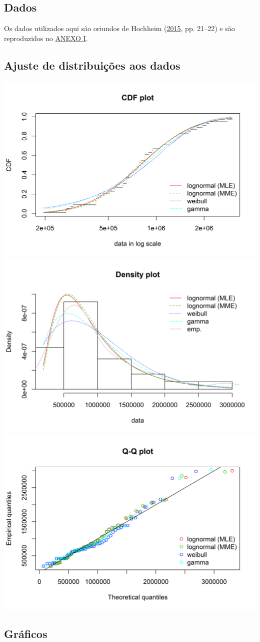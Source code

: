\documentclass[a4paper]{article}
\begin{document}
\subsection{Dados}\label{dados}

Os dados utilizados aqui são oriundos de Hochheim
(\protect\hyperlink{ref-hochheim}{2015}, pp. 21--22) e são reproduzidos
no \protect\hyperlink{anexo-i}{ANEXO I}.

\subsection{Ajuste de distribuições aos
dados}\label{ajuste-de-distribuicoes-aos-dados}

\begin{center}\includegraphics[width=0.49\linewidth]{images/unnamed-chunk-2-1} \includegraphics[width=0.49\linewidth]{images/unnamed-chunk-2-2} \includegraphics[width=0.49\linewidth]{images/unnamed-chunk-2-3} \end{center}

\subsection{Gráficos}\label{graficos}
\end{document}

